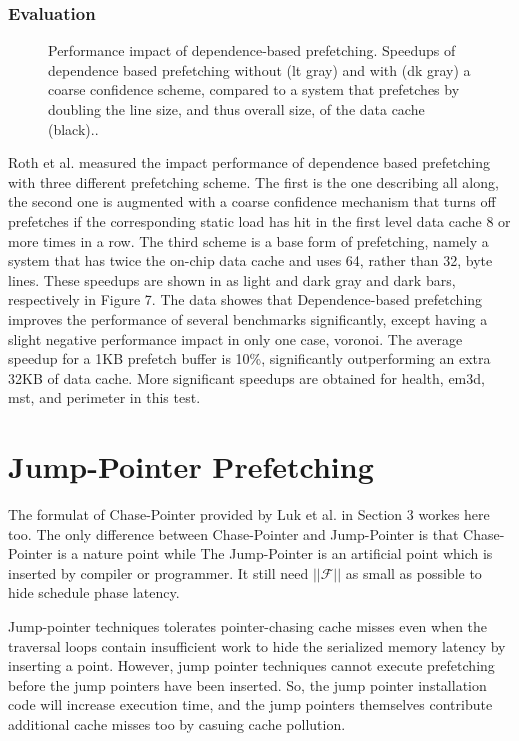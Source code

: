 \documentclass{acm_proc_article-sp}
\begin{document}
\subsubsection{Evaluation}

\begin{figure}
\centering
{}
\caption{Performance impact of dependence-based
prefetching. Speedups of dependence based prefetching
without (lt gray) and with (dk gray) a coarse confidence
scheme, compared to a system that prefetches by doubling the
line size, and thus overall size, of the data cache
(black)..\cite{Roth:1998:DBP:384265.291034}} 
\end{figure}
Roth et al. measured the impact performance  of dependence based
prefetching with three different 
prefetching scheme. The first is the one  describing
all along, the second one is augmented with a coarse confidence
mechanism that turns off prefetches if the corresponding static
load has hit in the first level data cache 8 or more times in a
row. The third scheme is a base form of prefetching, namely a system
that has twice the on-chip data cache and uses 64, rather than 32, byte lines.
These speedups are shown in as light and dark gray and dark bars, respectively
in Figure 7. The data showes that Dependence-based prefetching improves the
performance of several benchmarks significantly, except having a slight
negative performance 
impact in only one case, voronoi. The average speedup 
for a 1KB prefetch buffer is 10\%, significantly outperforming an
extra 32KB of data cache. More significant speedups are obtained
for health, em3d, mst, and perimeter in this test.

\section{Jump-Pointer Prefetching}
The formulat of Chase-Pointer provided by Luk et al. in Section 3
workes here too.\cite{Luk:1996:CPR:248208.237190} The only difference
between Chase-Pointer and 
Jump-Pointer is that  Chase-Pointer is a nature point while The
Jump-Pointer is an artificial point which is inserted by compiler or
programmer. It still need  $||\mathcal{F}||$ as small as possible to
hide schedule phase latency.

Jump-pointer techniques tolerates pointer-chasing cache
misses even when the traversal loops contain insufficient work to
hide the serialized memory latency by inserting a point. However, jump
pointer techniques cannot execute prefetching before the jump pointers have
been inserted. So, the jump pointer installation code
will increase execution time, and the jump pointers themselves contribute
additional cache misses too by casuing cache pollution.
\end{document}
